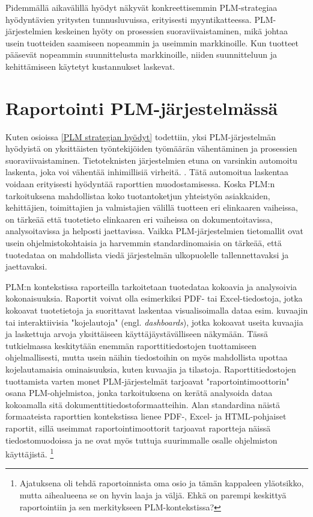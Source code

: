 Pidemmällä aikavälillä hyödyt näkyvät konkreettisemmin PLM-strategiaa hyödyntävien yritysten tunnusluvuissa, erityisesti myyntikatteessa. PLM-järjestelmien keskeinen hyöty on prosessien suoraviivaistaminen, mikä johtaa usein tuotteiden saamiseen nopeammin ja useimmin markkinoille. Kun tuotteet pääsevät nopeammin suunnittelusta markkinoille, niiden suunnitteluun ja kehittämiseen käytetyt kustannukset laskevat. \cite{bouhaddou_plm_2012} \cite{alemanni_key_2008}

\section{Raportointi PLM-järjestelmässä} \label{Raportointi PLM-järjestelmässä}

Kuten osioissa \ref{PLM strategian hyödyt} todettiin, yksi PLM-järjestelmän hyödyistä on yksittäisten työntekijöiden työmäärän vähentäminen ja prosessien suoraviivaistaminen. Tietoteknisten järjestelmien etuna on varsinkin automoitu laskenta, joka voi vähentää inhimillisiä virheitä. \cite{niu_organizational_2021}. \cite{rakovic_digital_2022} Tätä automoitua laskentaa voidaan erityisesti hyödyntää raporttien muodostamisessa.
Koska PLM:n tarkoituksena mahdollistaa koko tuotantoketjun yhteistyön asiakkaiden, kehittäjien, toimittajien ja valmistajien välillä tuotteen eri elinkaaren vaiheissa, \cite{bouhaddou_plm_2012} on tärkeää että tuotetieto elinkaaren eri vaiheissa on dokumentoitavissa, analysoitavissa ja helposti jaettavissa. Vaikka PLM-järjestelmien tietomallit ovat usein ohjelmistokohtaisia ja harvemmin standardinomaisia \cite{SritiMohamed-Foued2012PTaS} on tärkeää, että tuotedataa on mahdollista viedä järjestelmän ulkopuolelle tallennettavaksi ja jaettavaksi.

PLM:n kontekstissa raporteilla tarkoitetaan tuotedataa kokoavia ja analysoivia kokonaisuuksia. Raportit voivat olla esimerkiksi PDF- tai Excel-tiedostoja, jotka kokoavat tuotetietoja ja suorittavat laskentaa visualisoimalla dataa esim. kuvaajin tai interaktiivisia "kojelautoja" (engl. \textit{dashboards}), jotka kokoavat useita kuvaajia ja laskettuja arvoja yksittäiseen käyttäjäystävälliseen näkymään. Tässä tutkielmassa keskitytään enemmän raporttitiedostojen tuottamiseen ohjelmallisesti, mutta usein näihin tiedostoihin on myös mahdollista upottaa kojelautamaisia ominaisuuksia, kuten kuvaajia ja tilastoja.
Raporttitiedostojen tuottamista varten monet PLM-järjestelmät tarjoavat "raportointimoottorin" osana PLM-ohjelmistoa, jonka tarkoituksena on kerätä analysoida dataa kokoamalla sitä dokumenttitiedostoformaatteihin. Alan standardina näistä formaateista raporttien kontekstissa lienee PDF-, Excel- ja HTML-pohjaiset raportit, sillä useimmat raportointimoottorit tarjoavat raportteja näissä tiedostomuodoissa ja ne ovat myös tuttuja suurimmalle osalle ohjelmiston käyttäjistä. \footnote{Ajatuksena oli tehdä raportoinnista oma osio ja tämän kappaleen yläotsikko, mutta aihealueena se on hyvin laaja ja väljä. Ehkä on parempi keskittyä raportointiin ja sen merkitykseen PLM-kontekstissa?}

